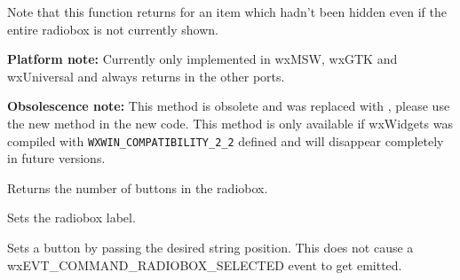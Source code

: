 Note that this function returns \true for an item which hadn't been hidden even
if the entire radiobox is not currently shown.

{\bf Platform note:} Currently only implemented in wxMSW, wxGTK and wxUniversal
and always returns \true in the other ports.


\label{wxradioboxnumber}


{\bf Obsolescence note:} This method is obsolete and was replaced with
, please use the new method in the new
code. This method is only available if wxWidgets was compiled with
{\tt WXWIN\_COMPATIBILITY\_2\_2} defined and will disappear completely in
future versions.

Returns the number of buttons in the radiobox.


\label{wxradioboxsetlabel}


Sets the radiobox label.







\label{wxradioboxsetselection}


Sets a button by passing the desired string position. This does not cause
a wxEVT\_COMMAND\_RADIOBOX\_SELECTED event to get emitted.




\label{wxradioboxsetstringselection}


